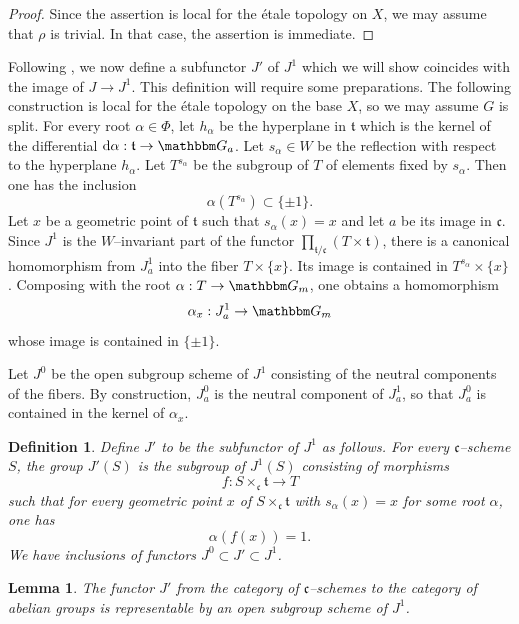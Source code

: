 \documentclass[12pt,english]{smfart}
\numberwithin{equation}{subsection}
\newtheorem{lemma}[equation]{Lemma}
\newtheorem{definition}[equation]{Definition}
\theoremstyle{remark}
\newcommand\GG{{\mathbbm G}}
\begin{document}
\begin{proof}
Since the assertion is local for the \'etale topology on $X$, we may assume that $\rho$ is trivial. In that case, the assertion is immediate.
\end{proof}

Following \cite{DG}, we now define a subfunctor $J'$ of $J^1$ which we will show coincides with the image of $J\to J^1$. This definition will require some preparations. The following construction is local for the \'etale topology on the base $X$, so we may assume $G$ is split. For every root $\alpha\in\Phi$, let $h_\alpha$ be the hyperplane in $\mathfrak{t}$ which is the kernel of the differential ${\mathrm d}\alpha:\mathfrak{t}\to\GG_a$. Let $s_\alpha\in W$ be the reflection with respect to the hyperplane $h_\alpha$. Let $T^{s_\alpha}$ be the subgroup of $T$ of elements fixed by $s_\alpha$. Then one has the inclusion
$$
\alpha(T^{s_\alpha})\subset \{\pm 1\}.
$$
Let $x$ be a geometric point of $\mathfrak{t}$ such that $s_\alpha(x)=x$ and let $a$ be its image in $\mathfrak{c}$. Since $J^1$ is the $W$--invariant part of the functor $\prod_{\mathfrak{t}/\mathfrak{c}} (T\times\mathfrak{t})$, there is a canonical homomorphism from $J^1_a$ into the fiber $T\times\{x\}$. Its image is contained in $T^{s_\alpha}\times\{x\}$. Composing with the root $\alpha:T\to\GG_m$, one obtains a homomorphism
$$
\alpha_x: J^1_a\to\GG_m
$$
whose image is contained in $\{\pm 1\}$.

Let $J^0$ be the open subgroup scheme of $J^1$ consisting of the neutral components of the fibers. By construction, $J^0_a$ is the neutral component of $J^1_a$, so that $J^0_a$ is contained in the kernel of $\alpha_x$.

\begin{definition}\label{J'}
Define $J'$ to be the subfunctor of $J^1$ as follows. For every $\mathfrak{c}$--scheme $S$, the group $J'(S)$ is the subgroup of $J^1(S)$ consisting of morphisms
$$
f: S\times_\mathfrak{c}\mathfrak{t} \to T
$$
such that for every geometric point $x$ of $S\times_\mathfrak{c}\mathfrak{t}$ with $s_\alpha(x)=x$ for some root $\alpha$, one has
$$
\alpha(f(x))=1.
$$
We have inclusions of functors $J^0\subset J'\subset J^1$.
\end{definition}

\begin{lemma}
The functor $J'$ from the category of $\mathfrak{c}$--schemes to the category of abelian groups is representable by an open subgroup scheme of $J^1$.
\end{lemma}
\end{document}

